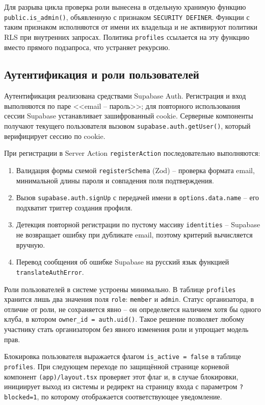 Для разрыва цикла проверка роли вынесена в отдельную хранимую
функцию \texttt{public.is\_admin()}, объявленную с признаком
\texttt{SECURITY DEFINER}. Функции с таким признаком исполняются
от имени их владельца и не активируют политики RLS при внутренних
запросах. Политика \texttt{profiles} ссылается на эту функцию вместо
прямого подзапроса, что устраняет рекурсию.

\subsection{Аутентификация и роли пользователей}

Аутентификация реализована средствами Supabase Auth. Регистрация
и вход выполняются по паре <<email -- пароль>>; для повторного
использования сессии Supabase устанавливает зашифрованный
cookie. Серверные компоненты получают текущего пользователя
вызовом \texttt{supabase.auth.getUser()}, который верифицирует
сессию по cookie.

При регистрации в Server Action \texttt{registerAction} последовательно
выполняются:

\begin{enumerate}
    \item Валидация формы схемой \texttt{registerSchema} (Zod) --
          проверка формата email, минимальной длины пароля и совпадения
          поля подтверждения.
    \item Вызов \texttt{supabase.auth.signUp} с передачей имени
          в \texttt{options.data.name} -- его подхватит триггер
          создания профиля.
    \item Детекция повторной регистрации по пустому массиву
          \texttt{identities} -- Supabase не возвращает ошибку при
          дубликате email, поэтому критерий вычисляется вручную.
    \item Перевод сообщения об ошибке Supabase на русский язык
          функцией \texttt{translateAuthError}.
\end{enumerate}

Роли пользователей в системе устроены минимально. В таблице
\texttt{profiles} хранится лишь два значения поля \texttt{role}:
\texttt{member} и \texttt{admin}. Статус организатора, в отличие
от роли, не сохраняется явно -- он определяется наличием хотя бы
одного клуба, в котором \texttt{owner\_id = auth.uid()}. Такое
решение позволяет любому участнику стать организатором без явного
изменения роли и упрощает модель прав.

Блокировка пользователя выражается флагом \texttt{is\_active = false}
в таблице \texttt{profiles}. При следующем переходе по защищённой
странице корневой компонент \texttt{(app)/layout.tsx} проверяет
этот флаг и, в случае блокировки, инициирует выход из системы
и редирект на страницу входа с параметром \texttt{?blocked=1},
по которому отображается соответствующее уведомление.

